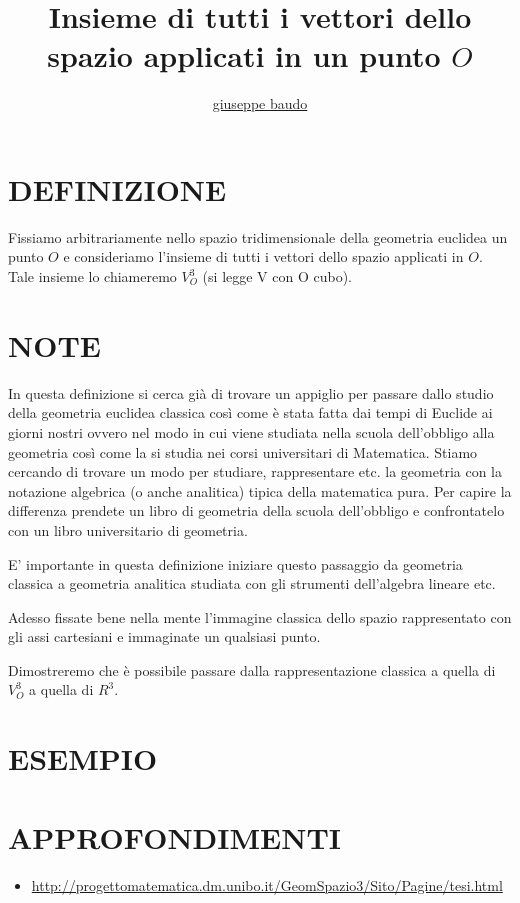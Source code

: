 \documentclass[a4paper,10pt]{article}
\title{Insieme di tutti i vettori dello spazio applicati in un punto $O$}
\author{\href{http://www.baudo.hol.es}{giuseppe baudo}}
\begin{document}
\maketitle

\section{DEFINIZIONE}
Fissiamo arbitrariamente nello spazio tridimensionale della geometria euclidea un punto $O$ e consideriamo l'insieme di tutti i vettori dello spazio 
applicati in $O$. Tale insieme lo chiameremo $V_{O}^{3}$ (si legge V con O cubo).

\section{NOTE}
In questa definizione si cerca già di trovare un appiglio per passare dallo studio della geometria euclidea classica così come è stata
fatta dai tempi di Euclide ai giorni nostri ovvero nel modo in cui viene studiata nella scuola dell'obbligo alla geometria così come la
si studia nei corsi universitari di Matematica. Stiamo cercando di trovare un modo per studiare, rappresentare etc. la geometria con 
la notazione algebrica (o anche analitica) tipica della matematica pura. Per capire la differenza prendete un libro di geometria della
scuola dell'obbligo e confrontatelo con un libro universitario di geometria.

E' importante in questa definizione iniziare questo passaggio da geometria classica a geometria analitica studiata con gli strumenti
dell'algebra lineare etc.

Adesso fissate bene nella mente l'immagine classica dello spazio rappresentato con gli assi cartesiani e immaginate un qualsiasi punto.

Dimostreremo che è possibile passare dalla rappresentazione classica a quella di $V_{O}^{3}$ a quella di $R^3$.

\section{ESEMPIO}

\section{APPROFONDIMENTI}
\begin{itemize}
 \item \href{http://progettomatematica.dm.unibo.it/GeomSpazio3/Sito/Pagine/tesi.html}{http://progettomatematica.dm.unibo.it/GeomSpazio3/Sito/Pagine/tesi.html}
\end{itemize}
\end{document}
